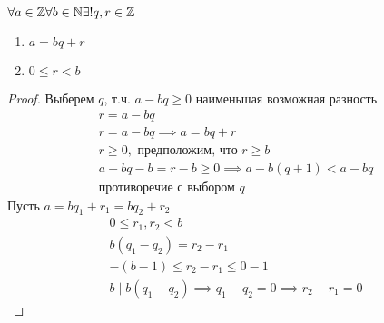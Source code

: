 \documentclass[main]{subfiles}
\begin{document}
\begin{theorem}
    $\forall a \in \mathbb{Z} \forall b \in \mathbb{N} \exists! q,r \in \mathbb{Z}$
    \begin{enumerate}
        \item $a=bq +r$
        \item $0 \le r < b$
    \end{enumerate}
\end{theorem}
\begin{proof}
    Выберем  $q$, т.ч. $a-bq\ge 0$ наименьшая возможная разность
    \begin{gather*}
        r = a-bq\\
        r = a -bq \implies a = bq+r\\
        r \ge 0, \text{ предположим, что } r \ge b\\
        a-bq-b=r-b \ge 0 \implies a - b(q+1) < a -bq\\
        \text{противоречие с выбором } q
    \end{gather*}
    Пусть $a = bq_1 + r_1 = bq_2+r_2$
    \begin{gather*}
        0 \le r_1, r_2 <b \\
        b(q_1-q_2) = r_2-r_1\\
        -(b-1)\le r_2 - r_1 \le 0-1\\
        b \mid b(q_1-q_2) \implies q_1-q_2 = 0 \implies r_2-r_1=0
    \end{gather*}
\end{proof}
\end{document}

